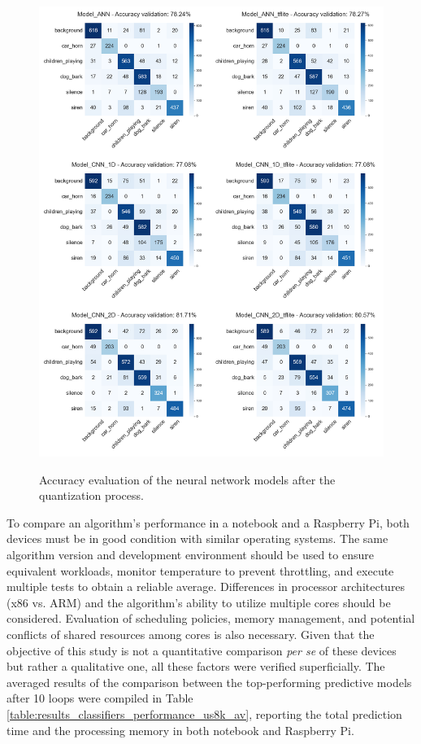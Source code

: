 \begin{figure}[htbp]
    \raggedright
        \caption{Accuracy evaluation of the neural network models after the quantization process.}
        \includegraphics[width=1\textwidth]{resources/images/060-results/Results_classification_overview_models_evaluation_2.png}
        \label{fig:Results_nn_models_evaluation}
\end{figure}

To compare an algorithm's performance in a notebook and a Raspberry Pi, both devices must be in good condition with similar operating systems. The same algorithm version and development environment should be used to ensure equivalent workloads, monitor temperature to prevent throttling, and execute multiple tests to obtain a reliable average. Differences in processor architectures (x86 vs. ARM) and the algorithm's ability to utilize multiple cores should be considered. Evaluation of scheduling policies, memory management, and potential conflicts of shared resources among cores is also necessary. Given that the objective of this study is not a quantitative comparison \textit{per se} of these devices but rather a qualitative one, all these factors were verified superficially. The averaged results of the comparison between the top-performing predictive models after 10 loops were compiled in Table \ref{table:results_classifiers_performance_us8k_av}, reporting the total prediction time and the processing memory in both notebook and Raspberry Pi.

